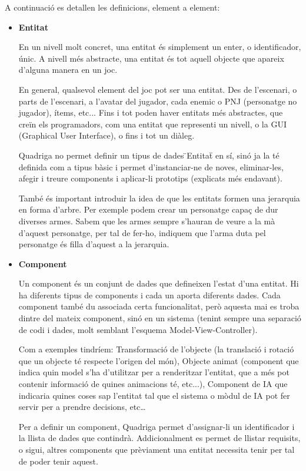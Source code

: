   A continuació es detallen les definicions, element a element:
  
  \begin{itemize}
    \item{\bf Entitat}

      En un nivell molt concret, una entitat és simplement un enter, o identificador, únic. A nivell més abstracte, una entitat és tot aquell objecte que apareix d'alguna manera en un joc.
      
      En general, qualsevol element del joc pot ser una entitat. Des de l'escenari, o parts de l'escenari, a l'avatar del jugador, cada enemic o PNJ (personatge no jugador), ítems, etc... Fins i tot poden haver entitats més abstractes, que creïn els programadors, com una entitat que representi un nivell, o la GUI (Graphical User Interface), o fins i tot un diàleg.

      Quadriga no permet definir un tipus de dades \"{}Entitat\"{} en sí, sinó ja la té definida com a tipus bàsic i permet d'instanciar-ne de noves, eliminar-les, afegir i treure components i aplicar-li prototips (explicats més endavant).
      
      També és important introduir la idea de que les entitats formen una jerarquia en forma d'arbre. Per exemple podem crear un personatge capaç de dur diverses armes. Sabem que les armes sempre s'hauran de veure a la mà d'aquest personatge, per tal de fer-ho, indiquem que l'arma duta pel personatge és filla d'aquest a la jerarquia.
      
    \item{\bf Component}

      Un component és un conjunt de dades que defineixen l'estat d'una entitat. Hi ha diferents tipus de components i cada un aporta diferents dades. Cada component també du associada certa funcionalitat, però aquesta mai es troba dintre del mateix component, sinó en un sistema (tenint sempre una separació de codi i dades, molt semblant l'esquema Model-View-Controller).
      
      Com a exemples tindríem: Transformació de l'objecte (la translació i rotació que un objecte té respecte l'origen del món), Objecte animat (component que indica quin model s'ha d'utilitzar per a renderitzar l'entitat, que a més pot contenir informació de quines animacions té, etc...), Component de IA que indicaria quines coses sap l'entitat tal que el sistema o mòdul de IA pot fer servir per a prendre decisions, etc\ldots
      
      Per a definir un component, Quadriga permet d'assignar-li un identificador i la llista de dades que contindrà. Addicionalment es permet de llistar requisits, o sigui, altres components que prèviament una entitat necessita tenir per tal de poder tenir aquest.
      

\end{itemize}
